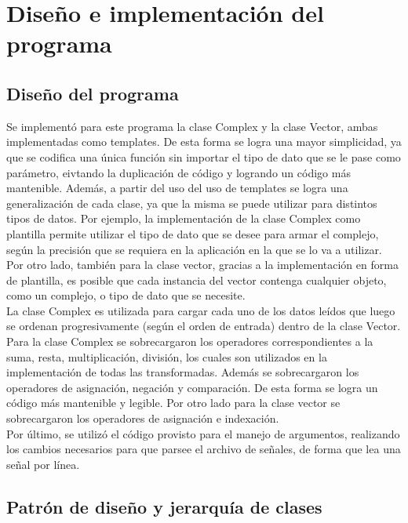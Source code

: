 \documentclass[12pt,a4paper]{report}
\begin{document}
	\section{Diseño e implementación del programa}	
	
        \subsection{Diseño del programa}
            \indent Se implementó para este programa la clase Complex y la clase Vector, ambas implementadas como templates.
            De esta forma se logra una mayor simplicidad, ya que se codifica una única función sin importar el tipo de dato que
            se le pase como parámetro, eivtando la duplicación de código y logrando un código más mantenible. Además, a partir del 
            uso del uso de templates se logra una generalización de cada clase, ya que la misma se puede utilizar para distintos 
            tipos de datos. Por ejemplo, la implementación de la clase Complex como plantilla permite utilizar el tipo de dato que 
            se desee para armar el complejo, según la precisión que se requiera en la aplicación en la que se lo va a utilizar. 
            Por otro lado, también para la clase vector, gracias a la implementación en forma de plantilla, es posible que cada 
            instancia del vector contenga cualquier objeto, como un complejo, o tipo de dato que se necesite. 
            \\
            \indent La clase Complex es utilizada para cargar cada uno de los datos leídos que luego se ordenan progresivamente (según el orden
            de entrada) dentro de la clase Vector.
            \\
			\indent Para la clase Complex se sobrecargaron los operadores correspondientes a la suma, resta, multiplicación, 
			división, los cuales son utilizados en la implementación de todas las transformadas. Además se sobrecargaron los operadores
			de asignación, negación y comparación. De esta forma se logra un código más mantenible y legible. Por otro lado para 
			la clase vector se sobrecargaron los operadores de asignación e indexación. 
			\\
			\indent Por último, se utilizó el código provisto para el manejo de argumentos,	realizando los cambios necesarios para que 
			parsee el archivo de señales, de forma que lea una señal por línea.

		\subsection{Patrón de diseño y jerarquía de clases}
			
\end{document}
